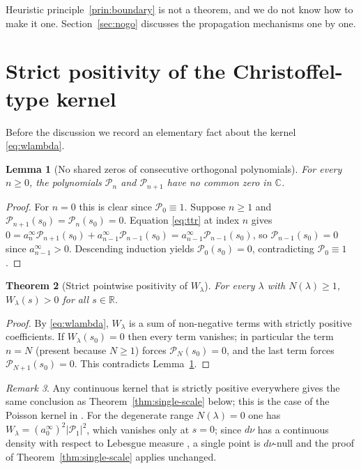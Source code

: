 \documentclass[11pt]{amsart}
\newtheorem{theorem}{Theorem}[section]
\newtheorem{lemma}[theorem]{Lemma}
\theoremstyle{definition}
\theoremstyle{remark}
\newtheorem{remark}[theorem]{Remark}
\newcommand{\bbR}{\mathbb{R}}
\newcommand{\bbC}{\mathbb{C}}
\newcommand{\dnu}{d\nu}
\newcommand{\Wl}{W_\lambda}
\begin{document}
Heuristic principle~\ref{prin:boundary} is not a theorem, and we do not know how to make it one.
Section~\ref{sec:nogo} discusses the propagation mechanisms one by one.

\section{Strict positivity of the Christoffel-type kernel}\label{sec:wlambda}

Before the discussion we record an elementary fact about the kernel \eqref{eq:wlambda}.

\begin{lemma}[No shared zeros of consecutive orthogonal polynomials]\label{lem:noshared}
For every $n\geq0$, the polynomials $\mathcal{P}_n$ and $\mathcal{P}_{n+1}$
have no common zero in $\bbC$.
\end{lemma}
\begin{proof}
For $n=0$ this is clear since $\mathcal P_0\equiv1$. Suppose $n\ge1$ and
$\mathcal{P}_{n+1}(s_0)=\mathcal{P}_n(s_0)=0$. Equation \eqref{eq:ttr} at index $n$ gives
$0=a_n^\infty\mathcal{P}_{n+1}(s_0)+a_{n-1}^\infty\mathcal{P}_{n-1}(s_0)
=a_{n-1}^\infty\mathcal{P}_{n-1}(s_0)$, so $\mathcal{P}_{n-1}(s_0)=0$ since
$a_{n-1}^\infty>0$. Descending induction yields
$\mathcal{P}_0(s_0)=0$, contradicting $\mathcal{P}_0\equiv1$.
\end{proof}

\begin{theorem}[Strict pointwise positivity of $\Wl$]\label{thm:wlambda-strict}
For every $\lambda$ with $N(\lambda)\geq1$, $\Wl(s)>0$ for all $s\in\bbR$.
\end{theorem}
\begin{proof}
By \eqref{eq:wlambda}, $\Wl$ is a sum of non-negative terms with strictly
positive coefficients. If $\Wl(s_0)=0$ then every term vanishes; in
particular the term $n=N$ (present because $N\geq1$) forces
$\mathcal{P}_N(s_0)=0$, and the last term forces
$\mathcal{P}_{N+1}(s_0)=0$. This contradicts Lemma~\ref{lem:noshared}.
\end{proof}

\begin{remark}
Any continuous kernel that is strictly positive everywhere gives the same conclusion as
Theorem~\ref{thm:single-scale} below; this is the case of the Poisson kernel in
\cite[Thm.~5.3]{P24}. For the degenerate range $N(\lambda)=0$ one has
$\Wl=(a_0^\infty)^2|\mathcal{P}_1|^2$, which vanishes only at $s=0$; since $\dnu$ has a continuous
density with respect to Lebesgue measure \cite[Cor.~3.2]{P24}, a single point is $\dnu$-null and
the proof of Theorem~\ref{thm:single-scale} applies unchanged.
\end{remark}
\end{document}
